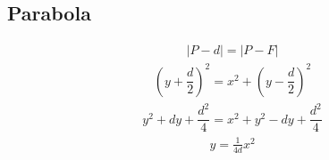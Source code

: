\documentclass[letterpaper,10pt,english]{jupyterBook}
\begin{document}
\subsection{Parabola}
\label{\detokenize{ch/analytic_geometry/analytic_geometry_2d/conics-cartesian:parabola}}\begin{equation*}
\begin{split}|P - d| = |P - F|\end{split}
\end{equation*}
\sphinxAtStartPar
{}
\begin{equation*}
\begin{split}\left(y+\dfrac{d}{2}\right)^2 = x^2 + \left(y-\dfrac{d}{2}\right)^2\end{split}
\end{equation*}\begin{equation*}
\begin{split}y^2 + d y + \dfrac{d^2}{4} = x^2 + y^2 - d y + \dfrac{d^2}{4}\end{split}
\end{equation*}\begin{equation*}
\begin{split}y = \frac{1}{4d} x^2\end{split}
\end{equation*}
\end{document}
